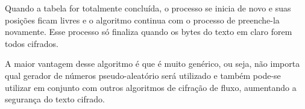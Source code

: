 Quando a tabela for totalmente concluída, o processo se inicia de novo e suas posições ficam livres e o algoritmo continua com o processo de preenche-la novamente. Esse processo só finaliza quando os bytes do texto em claro forem todos cifrados. 

A maior vantagem desse algoritmo é que é muito genérico, ou seja, não importa qual gerador de números pseudo-aleatório será utilizado e também pode-se utilizar em conjunto com outros algoritmos de cifração de fluxo, aumentando a segurança do texto cifrado.